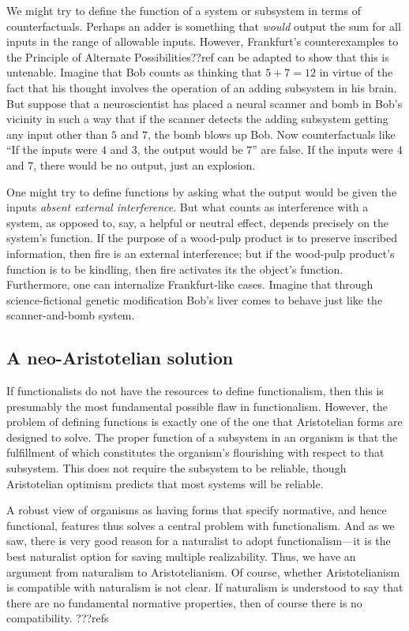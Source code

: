 We might try to define the function of a system or subsystem in terms of counterfactuals. Perhaps an adder is something that \textit{would}
output the sum for all inputs in the range of allowable inputs. However, Frankfurt's counterexamples to the Principle of Alternate
Possibilities??ref can be adapted to show that this is untenable. Imagine that Bob counts as thinking that $5+7=12$ in virtue of the 
fact that his thought involves the operation of an adding subsystem in his brain. But suppose that a neuroscientist has placed a neural
scanner and bomb in Bob's vicinity in such a way that if the scanner detects the adding subsystem getting any input other than 
$5$ and $7$, the bomb blows up Bob. Now counterfactuals like ``If the inputs were $4$ and $3$, the output would be $7$'' are false.
If the inputs were $4$ and $7$, there would be no output, just an explosion.

One might try to define functions by asking what the output would be given the inputs \textit{absent external interference}. 
But what counts as interference with a system, as opposed to, say, a helpful or neutral effect, depends precisely on the system's
function. If the purpose of a wood-pulp product is to preserve inscribed information, then fire is an external interference;
but if the wood-pulp product's function is to be kindling, then fire activates its the object's function. 
Furthermore, one can internalize Frankfurt-like cases. Imagine that through science-fictional genetic modification Bob's liver
comes to behave just like the scanner-and-bomb system. 

\subsection{A neo-Aristotelian solution}
If functionalists do not have the resources to define functionalism, then this is presumably the most fundamental possible flaw
in functionalism. However, the problem of defining functions is exactly one of the one that Aristotelian forms are designed to solve.  The proper function
of a subsystem in an organism is that the fulfillment of which constitutes the organism's flourishing with respect to that subsystem.
This does not require the subsystem to be reliable, though Aristotelian optimism predicts that most systems will be reliable. 

A robust view of organisms as having forms that specify normative, and hence functional, features thus solves a central
problem with functionalism. And as we saw, there is very good reason for a naturalist to adopt functionalism---it is the
best naturalist option for saving multiple realizability. Thus, we have an argument from naturalism to Aristotelianism.
Of course, whether Aristotelianism is compatible with naturalism is not clear. If naturalism is understood to say that 
there are no fundamental normative properties, then of course there is no compatibility.
???refs

